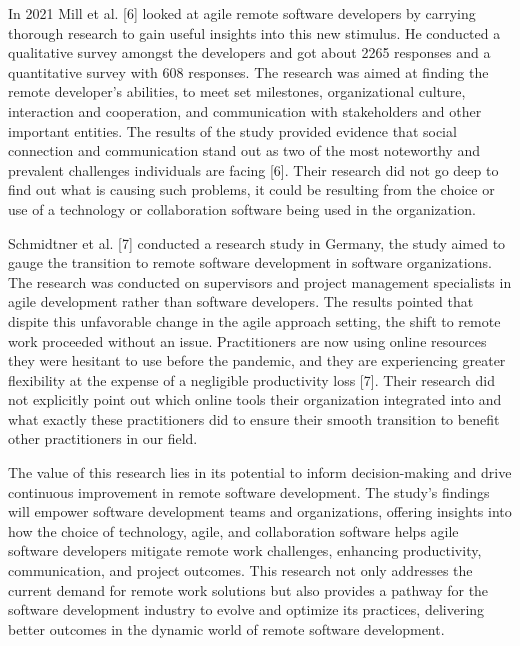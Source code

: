 \documentclass[conference]{IEEEtran}
\begin{document}
In 2021 Mill et al. [6] looked at agile remote software developers by carrying thorough research to gain useful insights into this new stimulus. He conducted a qualitative survey amongst the developers and got about 2265 responses and a quantitative survey with 608 responses. The research was aimed at finding the remote developer’s abilities, to meet set milestones, organizational culture, interaction and cooperation, and communication with stakeholders and other important entities. The results of the study provided evidence that social connection and communication stand out as two of the most noteworthy and prevalent challenges individuals are facing [6]. Their research did not go deep to find out what is causing such problems, it could be resulting from the choice or use of a technology or collaboration software being used in the organization. 

Schmidtner et al. [7] conducted a research study in Germany, the study aimed to gauge the transition to remote software development in software organizations. The research was conducted on supervisors and project management specialists in agile development rather than software developers. The results pointed that dispite this unfavorable change in the agile approach setting, the shift to remote work proceeded without an issue. Practitioners are now using online resources they were hesitant to use before the pandemic, and they are experiencing greater flexibility at the expense of a negligible productivity loss [7]. Their research did not explicitly point out which online tools their organization integrated into and what exactly these practitioners did to ensure their smooth transition to benefit other practitioners in our field.

The value of this research lies in its potential to inform decision-making and drive continuous improvement in remote software development. The study's findings will empower software development teams and organizations, offering insights into how the choice of technology, agile, and collaboration software helps agile software developers mitigate remote work challenges, enhancing productivity, communication, and project outcomes. This research not only addresses the current demand for remote work solutions but also provides a pathway for the software development industry to evolve and optimize its practices, delivering better outcomes in the dynamic world of remote software development.
\end{document}
